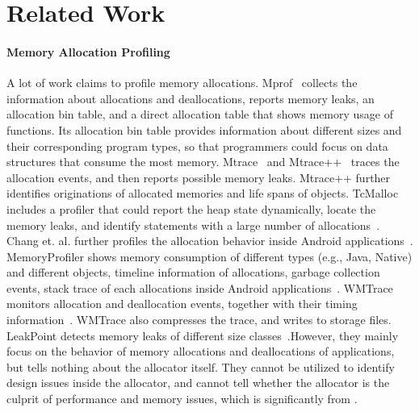 \section{Related Work}
\label{sec:relatedwork}

\paragraph{Memory Allocation Profiling} A lot of work claims to profile memory allocations. Mprof~\cite{Zorn:1988:MAP:894814} collects the information about allocations and deallocations, reports memory leaks, an allocation bin table, and a direct allocation table that shows memory usage of functions. Its allocation bin table provides information about different sizes and their corresponding program types, so that programmers could focus on data structures that consume the most memory. Mtrace~\cite{mtrace} and Mtrace++~\cite{Lee:2000:DMM:786772.787150} traces the allocation events, and then reports possible memory leaks. Mtrace++ further identifies originations of allocated memories and life spans of objects. TcMalloc includes a profiler that could report the heap state dynamically, locate the memory leaks, and identify statements with a large number of allocations~\cite{ghemawat2007tcmalloc}.  Chang et. al. further profiles the allocation behavior inside Android applications~\cite{7031343}. MemoryProfiler shows memory consumption of different types (e.g., Java, Native) and different objects, timeline information of allocations, garbage collection events, stack trace of each allocations inside Android applications~\cite{MemoryProfiler}. WMTrace monitors allocation and deallocation events, together with their timing information~\cite{Perks:2011:WAP:2186355.2186369}. WMTrace also compresses the trace, and writes to storage files. LeakPoint detects memory leaks of different size classes~\cite{Clause:2010:LPC:1806799.1806874}.However, they mainly focus on the behavior of memory allocations and deallocations of applications, but tells nothing about the allocator itself. They cannot be utilized to identify design issues inside the allocator, and cannot tell whether the allocator is the culprit of performance and memory issues, which is significantly from \MP{}. 

